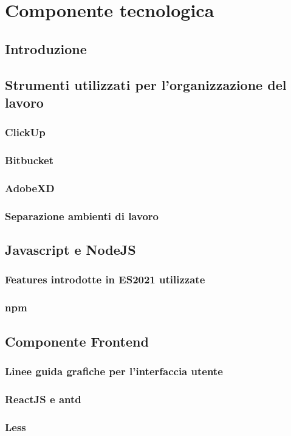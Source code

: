 \chapter{Componente tecnologica}
\section{Introduzione}
\section{Strumenti utilizzati per l'organizzazione del lavoro}
\subsection{ClickUp}
\subsection{Bitbucket}
\subsection{AdobeXD}
\subsection{Separazione ambienti di lavoro}

\section{Javascript e NodeJS}
\subsection{Features introdotte in ES2021 utilizzate}
\subsection{npm}
\newpage
\section{Componente Frontend}
\subsection{Linee guida grafiche per l'interfaccia utente}
\subsection{ReactJS e antd}
\subsection{Less}
\newpage
